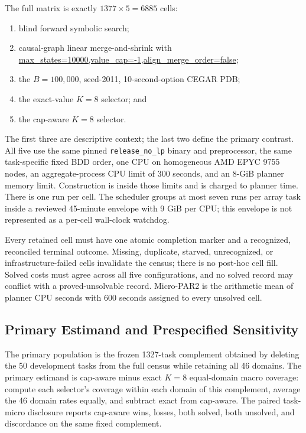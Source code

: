 The full matrix is exactly \(1377\times5=6885\) cells:

\begin{enumerate}
  \item blind forward symbolic search;
  \item causal-graph linear merge-and-shrink with
    \url{max_states=10000,value_cap=-1,align_merge_order=false};
  \item the \(B=100{,}000\), seed-2011, 10-second-option CEGAR PDB;
  \item the exact-value \(K=8\) selector; and
  \item the cap-aware \(K=8\) selector.
\end{enumerate}

The first three are descriptive context; the last two define the primary
contrast.  All five use the same pinned \texttt{release\_no\_lp} binary and
preprocessor, the same task-specific fixed BDD order, one CPU on homogeneous
AMD EPYC 9755 nodes, an aggregate-process CPU limit of 300 seconds, and an
8-GiB planner memory limit.  Construction is inside those limits and is
charged to planner time.  There is one run per cell.  The scheduler groups at
most seven runs per array task inside a reviewed 45-minute envelope with 9 GiB
per CPU; this envelope is not represented as a per-cell wall-clock watchdog.

Every retained cell must have one atomic completion marker and a recognized,
reconciled terminal outcome.  Missing, duplicate, starved, unrecognized, or
infrastructure-failed cells invalidate the census; there is no post-hoc cell
fill.  Solved costs must agree across all five configurations, and no solved
record may conflict with a proved-unsolvable record.  Micro-PAR2 is the
arithmetic mean of planner CPU seconds with 600 seconds assigned to every
unsolved cell.

\subsection{Primary Estimand and Prespecified Sensitivity}

The primary population is the frozen 1327-task complement obtained by deleting
the 50 development tasks from the full census while retaining all 46 domains.
The primary estimand is cap-aware minus exact \(K=8\) equal-domain macro
coverage: compute each selector's coverage within each domain of this
complement, average the 46 domain rates equally, and subtract exact from
cap-aware.  The paired task-micro disclosure reports cap-aware wins, losses,
both solved, both unsolved, and discordance on the same fixed complement.

